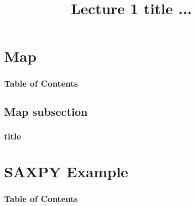 \documentclass[xcolor=dvipsnames]{beamer}
\begin{document}
	\title[Lecture 1]{Lecture 1 title ...}
	\author[]{\className}
	\institute[\className]{\departmentName}
	\date{} 


	\begin{frame}
		\maketitle
	\end{frame}


\section{Map} 

	\begin{frame} \frametitle{Table of Contents}
		\tableofcontents[currentsection]
	\end{frame} 
	
	
	\subsection{Map subsection}
	
		\begin{frame} \frametitle{title}
	
		\end{frame}

\section{SAXPY Example} 

	\begin{frame} \frametitle{Table of Contents}
		\tableofcontents[currentsection]
	\end{frame} 
	
\end{document}
